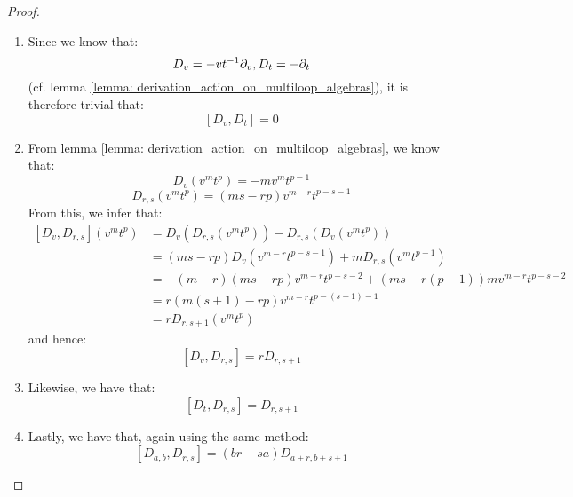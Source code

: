             \begin{proof}
                \begin{enumerate}
                    \item Since we know that:
                        $$D_v = -vt^{-1} \partial_v, D_t = -\partial_t$$
                    (cf. lemma \ref{lemma: derivation_action_on_multiloop_algebras}), it is therefore trivial that:
                        $$[D_v, D_t] = 0$$
                    \item From lemma \ref{lemma: derivation_action_on_multiloop_algebras}, we know that:
                        $$D_v(v^m t^p) = -m v^m t^{p - 1}$$
                        $$D_{r, s}(v^m t^p) = ( ms - rp ) v^{m - r} t^{p - s - 1}$$
                    From this, we infer that:
                        $$
                            \begin{aligned}
                                [D_v, D_{r, s}](v^m t^p) & = D_v( D_{r, s}(v^m t^p) ) - D_{r, s}( D_v(v^m t^p) )
                                \\
                                & = (ms - rp) D_v( v^{m - r} t^{p - s - 1} ) + m D_{r, s}( v^m t^{p - 1} )
                                \\
                                & = -(m - r)(ms - rp) v^{m - r} t^{p - s - 2} + (ms - r(p - 1)) m v^{m - r} t^{p - s - 2}
                                \\
                                & = r(m(s + 1) - rp) v^{m - r} t^{p - (s + 1) - 1}
                                \\
                                & = r D_{r, s + 1}(v^m t^p)
                            \end{aligned}
                        $$
                    and hence:
                        $$[D_v, D_{r, s}] = r D_{r, s + 1}$$
                    \item Likewise, we have that:
                        $$[D_t, D_{r, s}] = D_{r, s + 1}$$
                    \item Lastly, we have that, again using the same method:
                        $$[D_{a, b}, D_{r, s}] = (br - sa) D_{a + r, b + s + 1}$$
                \end{enumerate}
            \end{proof}


